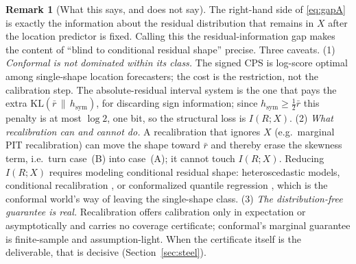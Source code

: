 \documentclass[11pt]{article}
\theoremstyle{definition}
\newtheorem{remark}{Remark}
\newcommand{\KL}{\mathrm{KL}}
\begin{document}
\begin{remark}[What this says, and does not say]
The right-hand side of \eqref{eq:gapA} is exactly the information about the residual
distribution that remains in $X$ after the location predictor is fixed. Calling this the
residual-information gap makes the content of ``blind to conditional residual shape'' precise. Three caveats. (1) \emph{Conformal is not dominated within its class.} The signed CPS is
log-score optimal among single-shape location forecasters; the cost is the restriction,
not the calibration step. The absolute-residual interval system is the one that pays the
extra $\KL(\bar r\,\|\,h_{\mathrm{sym}})$, for discarding sign information; since
$h_{\mathrm{sym}}\ge\tfrac12\bar r$ this penalty is at most $\log 2$, one bit, so the
structural loss is $I(R;X)$. (2)
\emph{What recalibration can and cannot do.} A recalibration that ignores $X$ (e.g.\
marginal PIT recalibration) can move the shape toward $\bar r$ and thereby erase the
skewness term, i.e.\ turn case~(B) into case~(A); it cannot touch $I(R;X)$. Reducing
$I(R;X)$ requires modeling conditional residual shape: heteroscedastic models,
conditional recalibration \citep{kuleshov2018accurate}, or conformalized quantile
regression \citep{romano2019conformalized}, which is the conformal world's way of leaving
the single-shape class. (3) \emph{The distribution-free guarantee is real.} Recalibration
offers calibration only in expectation or asymptotically and carries no coverage
certificate; conformal's marginal guarantee is finite-sample and assumption-light. When
the certificate itself is the deliverable, that is decisive (Section~\ref{sec:steel}).
\end{remark}
\end{document}
